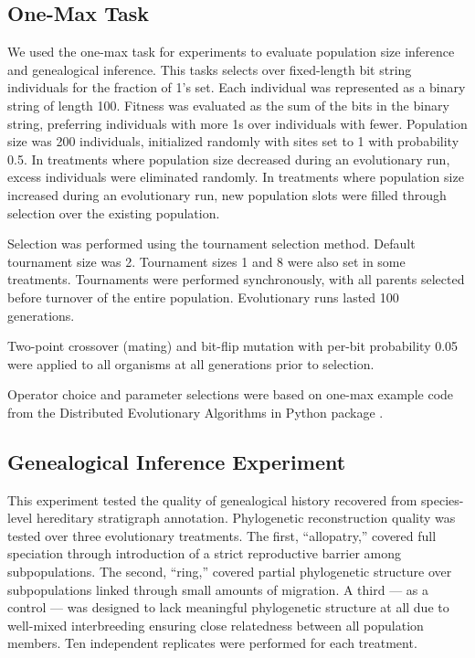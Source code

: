 \subsection{One-Max Task}
\label{sec:one-max}

We used the one-max task for experiments to evaluate population size inference and genealogical inference.
This tasks selects over fixed-length bit string individuals for the fraction of 1's set.
Each individual was represented as a binary string of length 100.
Fitness was evaluated as the sum of the bits in the binary string, preferring individuals with more 1s over individuals with fewer.
Population size was 200 individuals, initialized randomly with sites set to 1 with probability 0.5.
In treatments where population size decreased during an evolutionary run, excess individuals were eliminated randomly.
In treatments where population size increased during an evolutionary run,
new population slots were filled through selection over the existing population.

Selection was performed using the tournament selection method.
Default tournament size was 2.
Tournament sizes 1 and 8 were also set in some treatments.
Tournaments were performed synchronously, with all parents selected before turnover of the entire population.
Evolutionary runs lasted 100 generations.

Two-point crossover (mating) and bit-flip mutation with per-bit probability 0.05 were applied to all organisms at all generations prior to selection.

Operator choice and parameter selections were based on one-max example code from the Distributed Evolutionary Algorithms in Python package \citep{fortin2012deap}.

\subsection{Genealogical Inference Experiment}
\label{sec:genealogical-inference}

This experiment tested the quality of genealogical history recovered from species-level hereditary stratigraph annotation.
Phylogenetic reconstruction quality was tested over three evolutionary treatments.
The first, ``allopatry,'' covered full speciation through introduction of a strict reproductive barrier among subpopulations.
The second, ``ring,'' covered partial phylogenetic structure over subpopulations linked through small amounts of migration.
A third --- as a control --- was designed to lack meaningful phylogenetic structure at all due to well-mixed interbreeding ensuring close relatedness between all population members.
Ten independent replicates were performed for each treatment.


